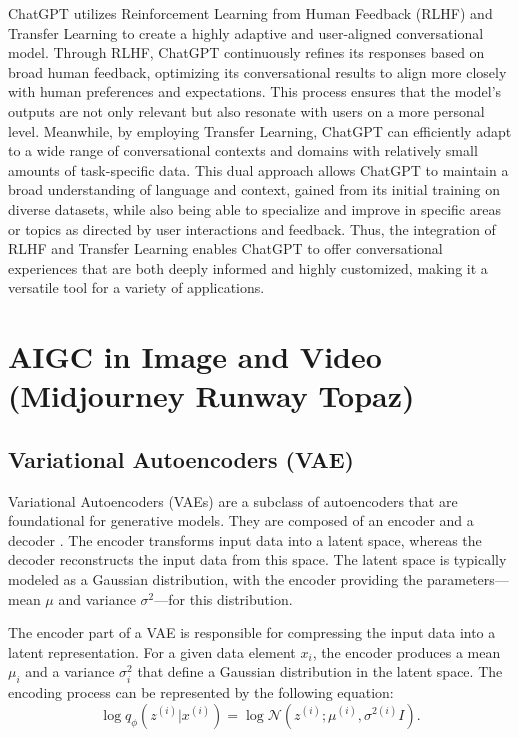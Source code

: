 \documentclass[11pt,a4paper,oneside]{report}
\begin{document}
ChatGPT utilizes Reinforcement Learning from Human Feedback (RLHF) and Transfer Learning to create a highly adaptive and user-aligned conversational model. 
Through RLHF, ChatGPT continuously refines its responses based on broad human feedback, optimizing its conversational results to align more closely with human preferences and expectations. 
This process ensures that the model's outputs are not only relevant but also resonate with users on a more personal level. 
Meanwhile, by employing Transfer Learning, ChatGPT can efficiently adapt to a wide range of conversational contexts and domains with relatively small amounts of task-specific data. 
This dual approach allows ChatGPT to maintain a broad understanding of language and context, gained from its initial training on diverse datasets, while also being able to specialize and improve in specific areas or topics as directed by user interactions and feedback. 
Thus, the integration of RLHF and Transfer Learning enables ChatGPT to offer conversational experiences that are both deeply informed and highly customized, making it a versatile tool for a variety of applications.

\section{AIGC in Image and Video (Midjourney Runway Topaz)}

\subsection{Variational Autoencoders (VAE)}

Variational Autoencoders (VAEs) are a subclass of autoencoders that are foundational for generative models. They are composed of an encoder and a decoder \cite{cho2014properties}. The encoder transforms input data into a latent space, whereas the decoder reconstructs the input data from this space. The latent space is typically modeled as a Gaussian distribution, with the encoder providing the parameters—mean $\mu$ and variance $\sigma^2$—for this distribution.

The encoder part of a VAE is responsible for compressing the input data into a latent representation. For a given data element $x_i$, the encoder produces a mean $\mu_i$ and a variance $\sigma^2_i$ that define a Gaussian distribution in the latent space. The encoding process can be represented by the following equation:
\begin{equation}
\log q_{\phi} \left( z^{(i)} | x^{(i)} \right) = \log \mathcal{N} \left( z^{(i)}; \mu^{(i)}, \sigma^{2(i)} I \right).
\end{equation}
\end{document}
